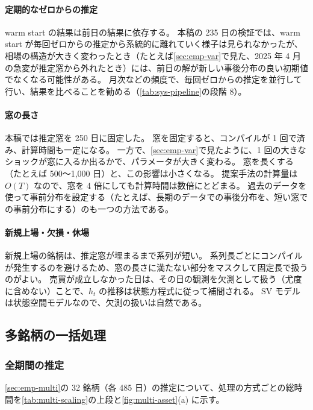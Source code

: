 \paragraph{定期的なゼロからの推定}
warm start の結果は前日の結果に依存する。
本稿の 235 日の検証では、warm start が毎回ゼロからの推定から系統的に離れていく様子は見られなかったが、
相場の構造が大きく変わったとき（たとえば\cref{sec:emp-var}で見た、2025 年 4 月の急変が推定窓から外れたとき）には、前日の解が新しい事後分布の良い初期値でなくなる可能性がある。
月次などの頻度で、毎回ゼロからの推定を並行して行い、結果を比べることを勧める（\cref{tab:sys-pipeline}の段階 8）。

\paragraph{窓の長さ}
本稿では推定窓を 250 日に固定した。
窓を固定すると、コンパイルが 1 回で済み、計算時間も一定になる。
一方で、\cref{sec:emp-var}で見たように、1 回の大きなショックが窓に入るか出るかで、パラメータが大きく変わる。
窓を長くする（たとえば 500〜1,000 日）と、この影響は小さくなる。
提案手法の計算量は $O(T)$ なので、窓を 4 倍にしても計算時間は数倍にとどまる。
過去のデータを使って事前分布を設定する（たとえば、長期のデータでの事後分布を、短い窓での事前分布にする）のも一つの方法である。

\paragraph{新規上場・欠損・休場}
新規上場の銘柄は、推定窓が埋まるまで系列が短い。
系列長ごとにコンパイルが発生するのを避けるため、窓の長さに満たない部分をマスクして固定長で扱うのがよい。
売買が成立しなかった日は、その日の観測を欠測として扱う（尤度に含めない）ことで、$h_t$ の推移は状態方程式に従って補間される。
SV モデルは状態空間モデルなので、欠測の扱いは自然である。

\subsection{多銘柄の一括処理}\label{sec:sys-multi}

\subsubsection{全期間の推定}

\cref{sec:emp-multi}の 32 銘柄（各 485 日）の推定について、処理の方式ごとの総時間を\cref{tab:multi-scaling}の上段と\cref{fig:multi-asset}(a) に示す。

